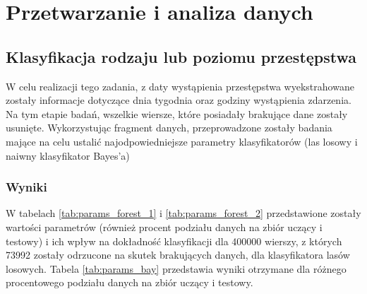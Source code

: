 \documentclass{classrep}
\begin{document}
    \section{Przetwarzanie i analiza danych} {

        \subsection{Klasyfikacja rodzaju lub poziomu przestępstwa} {
            W celu realizacji tego zadania, z daty wystąpienia przestępstwa
            wyekstrahowane zostały informacje dotyczące dnia tygodnia oraz godziny
            wystąpienia zdarzenia. Na tym etapie badań, wszelkie wiersze, które
            posiadały brakujące dane zostały usunięte.
            Wykorzystując fragment danych, przeprowadzone zostały badania mające na
            celu ustalić najodpowiedniejsze parametry klasyfikatorów (las losowy i
            naiwny klasyfikator Bayes'a)

            \subsubsection{Wyniki} {
                W tabelach \ref{tab:params_forest_1} i \ref{tab:params_forest_2}
                przedstawione zostały wartości parametrów (również procent podziału
                danych na zbiór uczący i testowy) i ich wpływ na dokładność
                klasyfikacji dla 400000 wierszy, z których 73992 zostały odrzucone na
                skutek brakujących danych, dla klasyfikatora lasów losowych.
                Tabela \ref{tab:params_bay} przedstawia wyniki otrzymane dla różnego
                procentowego podziału danych na zbiór uczący i testowy.

}}}
\end{document}
